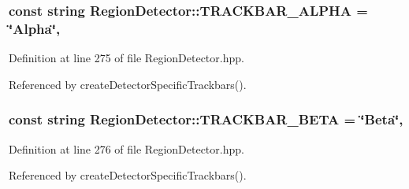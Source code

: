 \hypertarget{classmultiscale_1_1analysis_1_1RegionDetector_a5513e029d4d4cf249aa40364489f7a85}{
\subsubsection[{T\-R\-A\-C\-K\-B\-A\-R\-\_\-\-A\-L\-P\-H\-A}]{\setlength{\rightskip}{0pt plus 5cm}const string Region\-Detector\-::\-T\-R\-A\-C\-K\-B\-A\-R\-\_\-\-A\-L\-P\-H\-A = \char`\"{}Alpha\char`\"{}\hspace{0.3cm}{\ttfamily [static]}, {\ttfamily [private]}}}\label{classmultiscale_1_1analysis_1_1RegionDetector_a5513e029d4d4cf249aa40364489f7a85}


Definition at line 275 of file Region\-Detector.\-hpp.



Referenced by create\-Detector\-Specific\-Trackbars().

\hypertarget{classmultiscale_1_1analysis_1_1RegionDetector_a79d7878ed55bf12a87637896a1f44e37}{
\subsubsection[{T\-R\-A\-C\-K\-B\-A\-R\-\_\-\-B\-E\-T\-A}]{\setlength{\rightskip}{0pt plus 5cm}const string Region\-Detector\-::\-T\-R\-A\-C\-K\-B\-A\-R\-\_\-\-B\-E\-T\-A = \char`\"{}Beta\char`\"{}\hspace{0.3cm}{\ttfamily [static]}, {\ttfamily [private]}}}\label{classmultiscale_1_1analysis_1_1RegionDetector_a79d7878ed55bf12a87637896a1f44e37}


Definition at line 276 of file Region\-Detector.\-hpp.



Referenced by create\-Detector\-Specific\-Trackbars().

